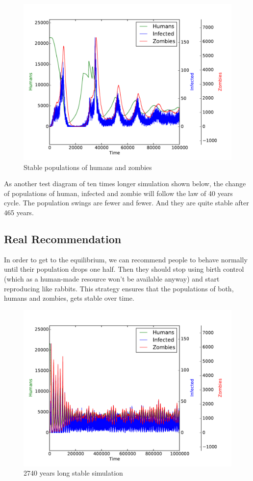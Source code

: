 \documentclass[a4paper]{article}
\begin{document}
\begin{figure}[pht]
    \centering
    \includegraphics[width=\textwidth]{stable}
    \caption{Stable populations of humans and zombies}
\end{figure}

As another test diagram of ten times longer simulation shown below, the change of populations of human, infected and zombie will follow the law of 40 years cycle.
The population swings are fewer and fewer.
And they are quite stable after 465 years.

\subsection{Real Recommendation}

In order to get to the equilibrium, we can recommend people to behave normally until their population drops one half.
Then they should stop using birth control (which as a human-made resource won't be available anyway) and start reproducing like rabbits.
This strategy ensures that the populations of both, humans and zombies, gets stable over time.

\begin{figure}[pht]
    \centering
    \includegraphics[width=\textwidth]{stable_1000000}
    \caption{2740 years long stable simulation}
\end{figure}

\begingroup
\raggedright



\endgroup
\end{document}
